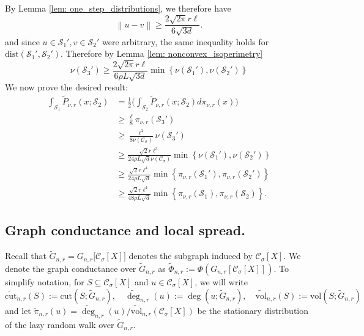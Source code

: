 \documentclass{article}
\newcommand{\set}[1]{\left\{#1\right\}}
\newcommand{\vol}{\mathrm{vol}}
\newcommand{\cut}{\mathrm{cut}}
\newcommand{\norm}[1]{\left\lVert#1\right\rVert}
\newcommand{\1}{\mathbf{1}}
\newcommand{\Xbf}{X}             %
\newcommand{\Sset}{\mathcal{S}}
\newcommand{\Cset}{\mathcal{C}}
\newcommand{\Csig}{\Cset_{\sigma}}
\theoremstyle{aldenthm}
\theoremstyle{aldenrmrk}
\begin{document}
By Lemma \ref{lem: one_step_distributions}, we therefore have
\begin{equation*}
\norm{u - v} \geq \frac{2 \sqrt{2 \pi } r \ell}{6\sqrt{3 d}}.
\end{equation*}
and since $u \in \Sset_1', v \in \Sset_2'$ were arbitrary, the same inequality holds for $\mathrm{dist}(\Sset_1', \Sset_2')$. Therefore by Lemma \ref{lem: nonconvex_isoperimetry}
\begin{equation*}
\nu(\Sset_3') \geq  \frac{2 \sqrt{2 \pi} r \ell}{6 \rho L \sqrt{3 d}} \min \set{\nu(\Sset_1'), \nu(\Sset_2')}
\end{equation*}
We now prove the desired result:
\begin{align*}
\int_{\Sset_1} \widetilde{P}_{\nu,r}(x; \Sset_2) & = \frac{1}{2} \biggl(\int_{\Sset_2} \widetilde{P}_{\nu,r}(x; \Sset_2)  d \pi_{\nu,r}(x) \biggr) \\
& \geq \frac{\ell}{8} \pi_{\nu,r}(\Sset_3') \\
& \geq \frac{\ell^2}{8 \nu(\Csig)} \nu(\Sset_3') \\
& \geq \frac{\sqrt{2} r \ell^3}{24 \rho L \sqrt{d} \nu(\Csig)} \min \set{\nu(\Sset_1'), \nu(\Sset_2')} \\
& \geq \frac{\sqrt{2} r \ell^4}{24 \rho L \sqrt{d}} \min \set {\pi_{\nu,r}(\Sset_1'), \pi_{\nu,r}(\Sset_2')} \\
& \geq \frac{\sqrt{2} r \ell^4}{48 \rho L \sqrt{d}} \min \set {\pi_{\nu,r}(\Sset_1), \pi_{\nu,r}(\Sset_2)}.
\end{align*}

\subsection{Graph conductance and local spread.}
\label{sec: graph_conductance_and_local_spread}

Recall that $\widetilde{G}_{n,r} = G_{n,r}\bigl[\Csig[\Xbf]\bigr]$ denotes the subgraph induced by $\Csig[\Xbf]$. We denote the graph conductance over $\widetilde{G}_{n,r}$ as $\widetilde{\Phi}_{n,r} := \Phi(G_{n,r}[\Csig[\Xbf]])$. To simplify notation, for $S \subseteq \Csig[\Xbf]$ and $u \in \Csig[\Xbf]$, we will write
\begin{equation*}
\widetilde{\cut}_{n,r}(S) := \cut(S; \widetilde{G}_{n,r}), \quad \widetilde{\deg}_{n,r}(u) := \deg(u; \widetilde{G}_{n,r}), \quad 
\widetilde{\vol}_{n,r}(S) := \vol(S; \widetilde{G}_{n,r})
\end{equation*}
and let $\widetilde{\pi}_{n,r}(u) = \widetilde{\deg}_{n,r}(u)/\widetilde{\vol}_{n,r}(\Csig[\Xbf])$ be the stationary distribution of the lazy random walk over $\widetilde{G}_{n,r}$.
\end{document}
